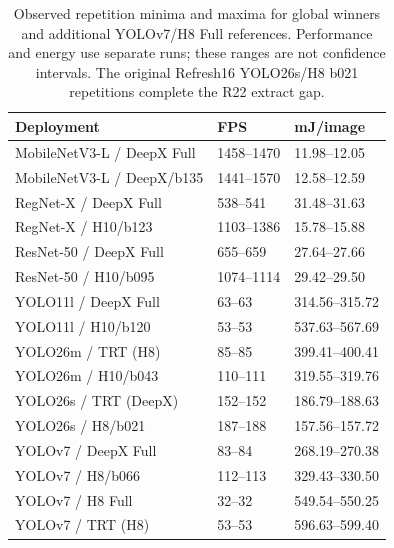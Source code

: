 \begin{table}[t]
\centering
\caption{Observed repetition minima and maxima for global winners and additional YOLOv7/H8 Full references. Performance and energy use separate runs; these ranges are not confidence intervals. The original Refresh16 YOLO26s/H8 b021 repetitions complete the R22 extract gap.}
\label{tab:winner-repeat-ranges}
\begingroup\small\setlength{\tabcolsep}{3pt}
\begin{tabular*}{\columnwidth}{@{\extracolsep{\fill}}l l l@{}}
\toprule
Deployment & FPS & mJ/image \\
\midrule
MobileNetV3-L / DeepX Full & 1458--1470 & 11.98--12.05 \\
MobileNetV3-L / DeepX/b135 & 1441--1570 & 12.58--12.59 \\
RegNet-X / DeepX Full & 538--541 & 31.48--31.63 \\
RegNet-X / H10/b123 & 1103--1386 & 15.78--15.88 \\
ResNet-50 / DeepX Full & 655--659 & 27.64--27.66 \\
ResNet-50 / H10/b095 & 1074--1114 & 29.42--29.50 \\
YOLO11l / DeepX Full & 63--63 & 314.56--315.72 \\
YOLO11l / H10/b120 & 53--53 & 537.63--567.69 \\
YOLO26m / TRT (H8) & 85--85 & 399.41--400.41 \\
YOLO26m / H10/b043 & 110--111 & 319.55--319.76 \\
YOLO26s / TRT (DeepX) & 152--152 & 186.79--188.63 \\
YOLO26s / H8/b021 & 187--188 & 157.56--157.72 \\
YOLOv7 / DeepX Full & 83--84 & 268.19--270.38 \\
YOLOv7 / H8/b066 & 112--113 & 329.43--330.50 \\
YOLOv7 / H8 Full & 32--32 & 549.54--550.25 \\
YOLOv7 / TRT (H8) & 53--53 & 596.63--599.40 \\
\bottomrule
\end{tabular*}
\endgroup
\end{table}
